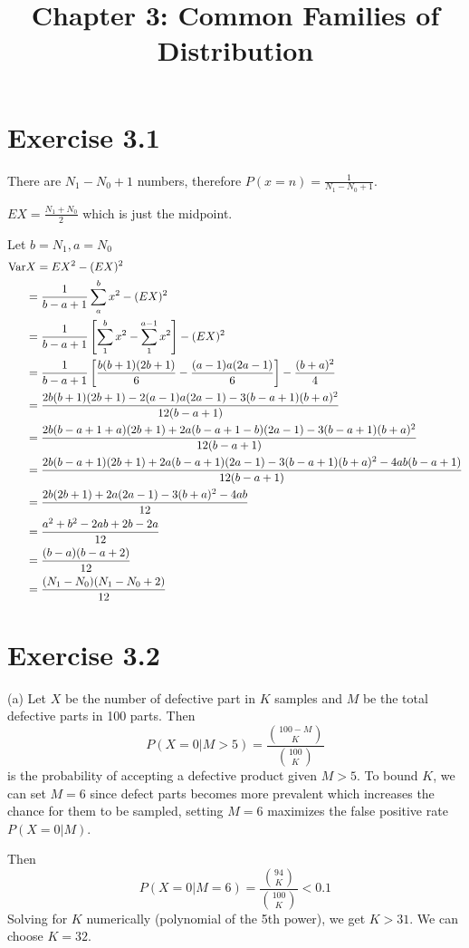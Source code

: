 \documentclass[12pt]{article}
\title{Chapter 3: Common Families of Distribution}
\begin{document}
\maketitle

\section*{Exercise 3.1}
There are $N_1 - N_0 +1$ numbers, therefore $P(x = n) = \frac{1}{N_1-N_0+1}$.

$EX = \frac{N_1+N_0}{2}$ which is just the midpoint.

Let $b=N_1, a=N_0$
$$
\begin{aligned}
\mathrm{Var} &X=EX^2 - (EX)^2 \\
    &= \frac{1}{b-a+1} \sum^{b}_{a}x^2  - (EX)^2  \\
   &= \frac{1}{b-a+1}\left[\sum^{b}_{1}x^2 - \sum^{a-1}_{1}x^2 \right] - (EX)^2 \\
   &= \frac{1}{b-a+1}\left[\frac{b(b +1)(2b+1)}{6} - \frac{(a-1)a(2a-1)}{6}\right] -  \frac{(b+a)^2}{4} \\
   &= \frac{2b(b +1)(2b+1)- 2(a-1)a(2a-1)-3(b-a+1)(b+a)^2}{12(b-a+1)} \\
   &= \frac{2b(b -a +1 + a)(2b+1) + 2a(b - a + 1 - b)(2a-1)-3(b-a+1)(b+a)^2}{12(b-a+1)} \\
   &= \frac{2b(b -a +1)(2b+1) + 2a(b - a + 1)(2a-1)-3(b-a+1)(b+a)^2 -4ab(b-a+1)}{12(b-a+1)} \\
   &= \frac{2b(2b+1) + 2a(2a-1)-3(b+a)^2 -4ab}{12} \\
   &= \frac{a^2+b^2 -2ab +2b-2a}{12} \\
   &= \frac{(b-a)(b-a+2)}{12} \\
   &= \frac{(N_1-N_0)(N_1-N_0+2)}{12} \\
\end{aligned}
$$

\section*{Exercise 3.2}
(a)
Let $X$ be the number of defective part in $K$ samples and $M$ be the total defective parts in 100 parts. Then
$$P(X=0 | M > 5) = \frac{{100 -M \choose K}}{{100 \choose K}}$$ 
is the probability of accepting a defective product given $M > 5$. 
To bound $K$, we can set $M = 6$ since defect parts becomes more prevalent which increases the chance for them to be sampled, setting $M=6$ maximizes the false positive rate $P(X=0|M)$.

Then
$$P(X=0 | M=6) = \frac{{94 \choose K}}{{100 \choose K}} < 0.1$$
Solving for $K$ numerically (polynomial of the 5th power), we get $K >31$. We can choose $K=32$.
\end{document}

